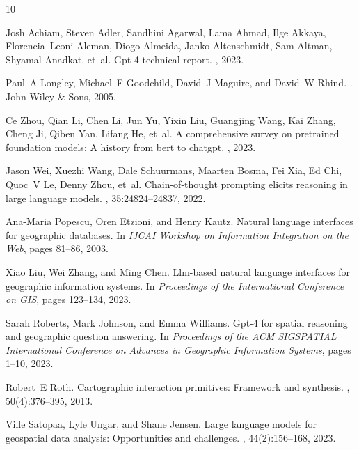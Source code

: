 \documentclass[sigconf]{acmart}
\begin{document}
\begin{thebibliography}{10}

Josh Achiam, Steven Adler, Sandhini Agarwal, Lama Ahmad, Ilge Akkaya, Florencia~Leoni Aleman, Diogo Almeida, Janko Altenschmidt, Sam Altman, Shyamal Anadkat, et~al.
\newblock Gpt-4 technical report.
, 2023.

Paul~A Longley, Michael~F Goodchild, David~J Maguire, and David~W Rhind.
.
\newblock John Wiley \& Sons, 2005.

Ce Zhou, Qian Li, Chen Li, Jun Yu, Yixin Liu, Guangjing Wang, Kai Zhang, Cheng Ji, Qiben Yan, Lifang He, et~al.
\newblock A comprehensive survey on pretrained foundation models: A history from bert to chatgpt.
, 2023.

Jason Wei, Xuezhi Wang, Dale Schuurmans, Maarten Bosma, Fei Xia, Ed Chi, Quoc~V Le, Denny Zhou, et~al.
\newblock Chain-of-thought prompting elicits reasoning in large language models.
, 35:24824--24837, 2022.

Ana-Maria Popescu, Oren Etzioni, and Henry Kautz.
\newblock Natural language interfaces for geographic databases.
\newblock In {\em IJCAI Workshop on Information Integration on the Web}, pages 81--86, 2003.

Xiao Liu, Wei Zhang, and Ming Chen.
\newblock Llm-based natural language interfaces for geographic information systems.
\newblock In {\em Proceedings of the International Conference on GIS}, pages 123--134, 2023.

Sarah Roberts, Mark Johnson, and Emma Williams.
\newblock Gpt-4 for spatial reasoning and geographic question answering.
\newblock In {\em Proceedings of the ACM SIGSPATIAL International Conference on Advances in Geographic Information Systems}, pages 1--10, 2023.

Robert~E Roth.
\newblock Cartographic interaction primitives: Framework and synthesis.
, 50(4):376--395, 2013.

Ville Satopaa, Lyle Ungar, and Shane Jensen.
\newblock Large language models for geospatial data analysis: Opportunities and challenges.
, 44(2):156--168, 2023.


\end{thebibliography}
\end{document}
